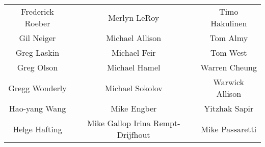 \begin{center}
\begin{tabular}{ccc}
Frederick Roeber & Merlyn LeRoy & Timo Hakulinen\\
Gil Neiger & Michael Allison & Tom Almy\\
Greg Laskin & Michael Feir & Tom West\\
Greg Olson & Michael Hamel & Warren Cheung\\
Gregg Wonderly & Michael Sokolov & Warwick Allison\\
Hao-yang Wang & Mike Engber & Yitzhak Sapir\\
Helge Hafting & Mike Gallop
Irina Rempt-Drijfhout & Mike Passaretti\\
\end{tabular}
\end{center}



